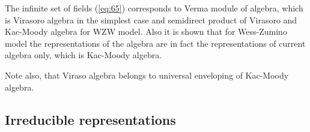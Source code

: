 \documentclass[a4paper,12pt]{article}
\theoremstyle{definition} \newtheorem{Def}{Definition}
\begin{document}
The infinite set of fields (\ref{eq:65}) corresponds to Verma module of algebra, which is Virasoro algebra in the simplest case and semidirect product of Virasoro and Kac-Moody algebra for WZW model. Also it is shown that for Wess-Zumino model the representations of the algebra are in fact the representations of current algebra only, which is Kac-Moody algebra.

Note also, that Viraso algebra belongs to universal enveloping of Kac-Moody algebra.

\subsection{Irreducible representations}
\label{sec:irred-repr}


{}

\end{document}
